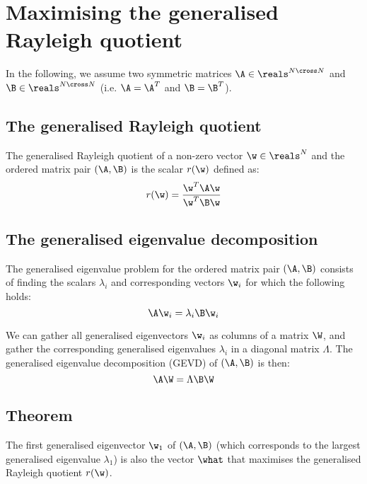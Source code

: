 \section{Maximising the generalised Rayleigh quotient}

In the following, we assume two symmetric matrices $\A \in \reals^{N \cross
N}$ and $\B \in \reals^{N \cross N}$ (i.e. $\A = \A^T$ and $\B =
\B^T$).



\subsection{The generalised Rayleigh quotient}

The generalised Rayleigh quotient of a non-zero vector $\w \in \reals^N$ and
the ordered matrix pair $(\A,\B)$ is the scalar $r(\w)$ defined as:
%
\begin{equation}
\label{eq:Rayleigh}
r(\w) = \frac{\w^T \A \w}
             {\w^T \B \w}
\end{equation}



\subsection{The generalised eigenvalue decomposition}

The generalised eigenvalue problem for the ordered matrix pair $(\A,\B)$
consists of finding the scalars $\lambda_i$ and corresponding vectors $\w_i$
for which the following holds:
%
\begin{equation}
\label{eq:GEVD}
\A \w_i = \lambda_i \B \w_i
\end{equation}

We can gather all generalised eigenvectors $\w_i$ as columns of a matrix
$\W$, and gather the corresponding generalised eigenvalues $\lambda_i$ in a
diagonal matrix $\Lambda$. The generalised eigenvalue decomposition (GEVD) of
$(\A,\B)$ is then:
\[
\A \W = \Lambda \B \W
\]



\subsection{Theorem}

The first generalised eigenvector $\w_1$ of $(\A,\B)$ (which corresponds to
the largest generalised eigenvalue $\lambda_1$) is also the vector $\what$
that maximises the generalised Rayleigh quotient $r(\w)$.



